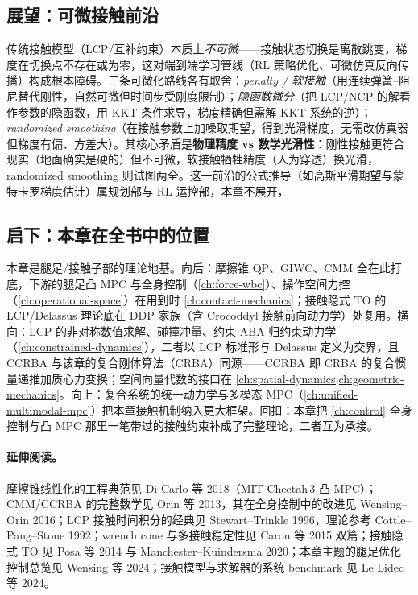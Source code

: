 \subsection{展望：可微接触前沿}
\label{subsec:differentiable}

传统接触模型（LCP/互补约束）本质上\emph{不可微}——接触状态切换是离散跳变，梯度在切换点不存在或为零，这对端到端学习管线（RL 策略优化、可微仿真反向传播）构成根本障碍。三条可微化路线各有取舍：\emph{penalty / 软接触}（用连续弹簧--阻尼替代刚性，自然可微但时间步受刚度限制）；\emph{隐函数微分}（把 LCP/NCP 的解看作参数的隐函数，用 KKT 条件求导，梯度精确但需解 KKT 系统的逆）；\emph{randomized smoothing}（在接触参数上加噪取期望，得到光滑梯度，无需改仿真器但梯度有偏、方差大）。其核心矛盾是\textbf{物理精度 vs 数学光滑性}：刚性接触更符合现实（地面确实是硬的）但不可微，软接触牺牲精度（人为穿透）换光滑，randomized smoothing 则试图两全。这一前沿的公式推导（如高斯平滑期望与蒙特卡罗梯度估计）属规划部与 RL 运控部，本章不展开，

\subsection{启下：本章在全书中的位置}
\label{subsec:next}

本章是腿足/接触子部的理论地基。向后：摩擦锥 QP、GIWC、CMM 全在此打底，下游的腿足凸 MPC 与全身控制（\cref{ch:force-wbc}）、操作空间力控（\cref{ch:operational-space}）在用到时 \cref{ch:contact-mechanics}；接触隐式 TO 的 LCP/Delassus 理论底在 DDP 家族（含 Crocoddyl 接触前向动力学）处复用。横向：LCP 的非对称数值求解、碰撞冲量、约束 ABA 归约束动力学（\cref{ch:constrained-dynamics}），二者以 LCP 标准形与 Delassus 定义为交界，且 CCRBA 与该章的复合刚体算法（CRBA）同源——CCRBA 即 CRBA 的复合惯量递推加质心力变换；空间向量代数的接口在 \cref{ch:spatial-dynamics,ch:geometric-mechanics}。向上：复合系统的统一动力学与多模态 MPC（\cref{ch:unified-multimodal-mpc}）把本章接触机制纳入更大框架。回扣：本章把 \cref{ch:control} 全身控制与凸 MPC 那里一笔带过的接触约束补成了完整理论，二者互为承接。

\paragraph{延伸阅读。}
摩擦锥线性化的工程典范见 Di Carlo 等 2018（MIT Cheetah\,3 凸 MPC）\cite{dicarlo2018cheetah}；CMM/CCRBA 的完整数学见 Orin 等 2013\cite{orin2013centroidal}，其在全身控制中的改进见 Wensing--Orin 2016\cite{wensing2016improved}；LCP 接触时间积分的经典见 Stewart--Trinkle 1996\cite{stewart1996implicit}，理论参考 Cottle--Pang--Stone 1992\cite{cottle1992linear}；wrench cone 与多接触稳定性见 Caron 等 2015 双篇\cite{caron2015stability,caron2015leveraging}；接触隐式 TO 见 Posa 等 2014\cite{posa2014direct} 与 Manchester--Kuindersma 2020\cite{manchester2020variational}；本章主题的腿足优化控制总览见 Wensing 等 2024\cite{wensing2024legged}；接触模型与求解器的系统 benchmark 见 Le Lidec 等 2024\cite{lelidec2024contactbench}。
